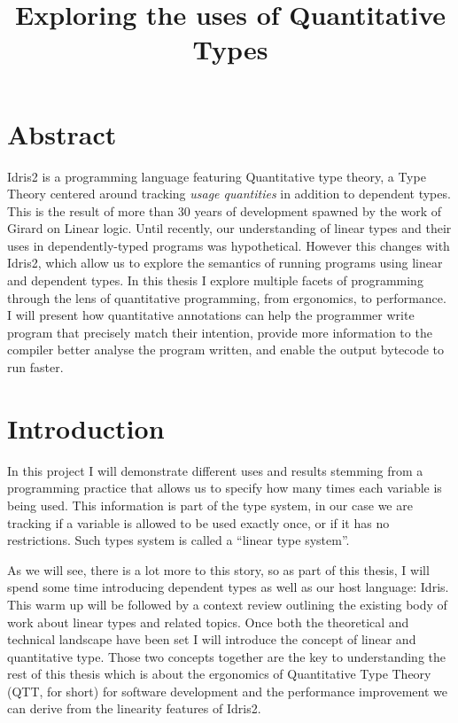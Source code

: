 \documentclass[
]{article}
\author{}
\date{}
\begin{document}
\title{Exploring the uses of Quantitative Types}
\maketitle

\hypertarget{abstract}{%
\section{Abstract}\label{abstract}}

Idris2 is a programming language featuring Quantitative type theory, a
Type Theory centered around tracking \emph{usage quantities} in addition
to dependent types. This is the result of more than 30 years of
development spawned by the work of Girard on Linear logic. Until
recently, our understanding of linear types and their uses in
dependently-typed programs was hypothetical. However this changes with
Idris2, which allow us to explore the semantics of running programs
using linear and dependent types. In this thesis I explore multiple
facets of programming through the lens of quantitative programming, from
ergonomics, to performance. I will present how quantitative annotations
can help the programmer write program that precisely match their
intention, provide more information to the compiler better analyse the
program written, and enable the output bytecode to run faster.

\newpage
\setcounter{secnumdepth}{2}
\tableofcontents
\newpage

\hypertarget{introduction}{%
\section{Introduction}\label{introduction}}

In this project I will demonstrate different uses and results stemming
from a programming practice that allows us to specify how many times
each variable is being used. This information is part of the type
system, in our case we are tracking if a variable is allowed to be used
exactly once, or if it has no restrictions. Such types system is called
a ``linear type system''.

As we will see, there is a lot more to this story, so as part of this
thesis, I will spend some time introducing dependent types as well as
our host language: Idris. This warm up will be followed by a context
review outlining the existing body of work about linear types and
related topics. Once both the theoretical and technical landscape have
been set I will introduce the concept of linear and quantitative type.
Those two concepts together are the key to understanding the rest of
this thesis which is about the ergonomics of Quantitative Type
Theory\cite{qtt}\cite{nuttin} (QTT, for short) for software development
and the performance improvement we can derive from the linearity
features of Idris2.
\end{document}
